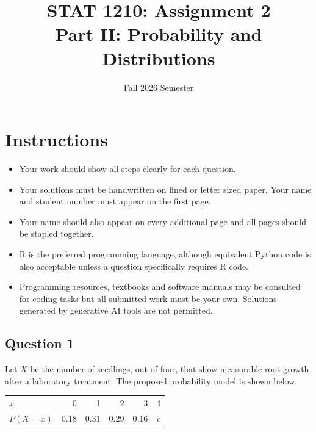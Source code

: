 \documentclass[10pt,letterpaper]{article}
\title{STAT 1210: Assignment 2\\[4pt]\large Part II: Probability and Distributions}
\author{Fall 2026 Semester}
\date{}
\providecommand{\tightlist}{%
  \setlength{\itemsep}{0pt}\setlength{\parskip}{0pt}}
\begin{document}
\maketitle
\section*{Instructions}
\begin{itemize}
\tightlist
\item Your work should show all steps clearly for each question.
\item Your solutions must be handwritten on lined or letter sized paper. Your name and student number must appear on the first page.
\item Your name should also appear on every additional page and all pages should be stapled together.
\item R is the preferred programming language, although equivalent Python code is also acceptable unless a question specifically requires R code.
\item Programming resources, textbooks and software manuals may be consulted for coding tasks but all submitted work must be your own. Solutions generated by generative AI tools are not permitted.
\end{itemize}

\newpage


\subsection*{Question 1}
Let \(X\) be the number of seedlings, out of four, that show measurable root growth after a laboratory treatment. The proposed probability model is shown below.
\begin{longtable}[]{@{}lrrrrr@{}}
\toprule\noalign{}
    \(x\) & 0 & 1 & 2 & 3 & 4 \\
    \(P(X=x)\) & 0.18 & 0.31 & 0.29 & 0.16 & \(c\)
\end{longtable}
\end{document}

